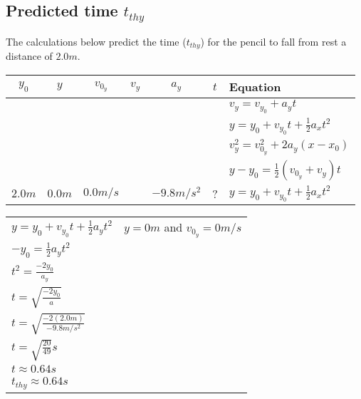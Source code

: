 \documentclass[11pt, letterpaper, includehead]{article}
\renewcommand{\arraystretch}{1.2}
\begin{document}
  \subsection{Predicted time $t_{thy}$} %
  The calculations below predict the time ($t_{thy}$) for the pencil to 
  fall from rest a distance of $2.0m$.
  \begin{center}
    \begin{tabular}{| c | c | c | c | c | c | l |} 
      \hline
      $y_0$ & $y$  & $v_{0_y}$ & $v_{y}$ & $a_y$ & $t$ & Equation \\ 
      \hline \hline
      \color{red}{$\times$} & \color{LimeGreen}{\checkmark} & \color{LimeGreen}{\checkmark} & \color{LimeGreen}{\checkmark} & \color{LimeGreen}{\checkmark} & \color{LimeGreen}{\checkmark} & $v_y = v_{y_0} + a_yt$ \\ 
      \hline
      \color{LimeGreen}{\checkmark} & \color{LimeGreen}{\checkmark} & \color{LimeGreen}{\checkmark} & \color{red}{$\times$} & \color{LimeGreen}{\checkmark} & \color{LimeGreen}{\checkmark} & $y = y_0 + v_{y_0}t + \frac{1}{2}a_xt^2$\\ 
      \hline
      \color{LimeGreen}{\checkmark} & \color{LimeGreen}{\checkmark} & \color{LimeGreen}{\checkmark} & \color{LimeGreen}{\checkmark} & \color{LimeGreen}{\checkmark} & \color{red}{$\times$} & $v_y^2 = v^2_{0_y} + 2a_y(x - x_0)$\\
      \hline
      \color{LimeGreen}{\checkmark} & \color{LimeGreen}{\checkmark} & \color{LimeGreen}{\checkmark} &  \color{LimeGreen}{\checkmark} &  \color{red}{$\times$} & \color{LimeGreen}{\checkmark} & $y - y_0 = \frac{1}{2}(v_{0_y} + v_y)t$\\
      \hline\hline
      $2.0m$ & $0.0m$ & $0.0m/s$ &  & $-9.8m/s^2$ & ? & $y = y_0 + v_{y_0}t + \frac{1}{2}a_xt^2$ \\
      \hline
    \end{tabular}
  \end{center}
  \begin{center}
  \renewcommand{\arraystretch}{1.75}
    \begin{tabular}{ m{4cm}  l } 
      $y = y_0 + v_{y_0}t + \frac{1}{2}a_yt^2$ & $y = 0m$ and $v_{0_y} = 0m/s$  \\
      $-y_0 = \frac{1}{2}a_yt^2$\\
      $t^2 = \frac{-2y_0}{a_y}$\\
      $t = \sqrt{\frac{-2y_0}{a}}$\\
      $t = \sqrt{\frac{-2(2.0m)}{-9.8m/s^2}}$\\
      $t = \sqrt{\frac{20}{49}}s$\\
      $t \approx 0.64s$\\
      $t_{thy}\approx 0.64s$
    \end{tabular} 
  \end{center}
\end{document}
